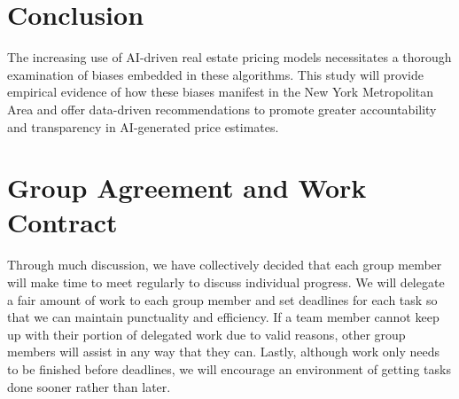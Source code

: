 \documentclass{article}
\begin{document}
\section{Conclusion}
The increasing use of AI-driven real estate pricing models necessitates a thorough examination of biases embedded in these algorithms. This study will provide empirical evidence of how these biases manifest in the New York Metropolitan Area and offer data-driven recommendations to promote greater accountability and transparency in AI-generated price estimates.

\section{Group Agreement and Work Contract}
Through much discussion, we have collectively decided that each group member will make time to meet regularly to discuss individual progress. We will delegate a fair amount of work to each group member and set deadlines for each task so that we can maintain punctuality and efficiency. If a team member cannot keep up with their portion of delegated work due to valid reasons, other group members will assist in any way that they can. Lastly, although work only needs to be finished before deadlines, we will encourage an environment of getting tasks done sooner rather than later.
\end{document}
